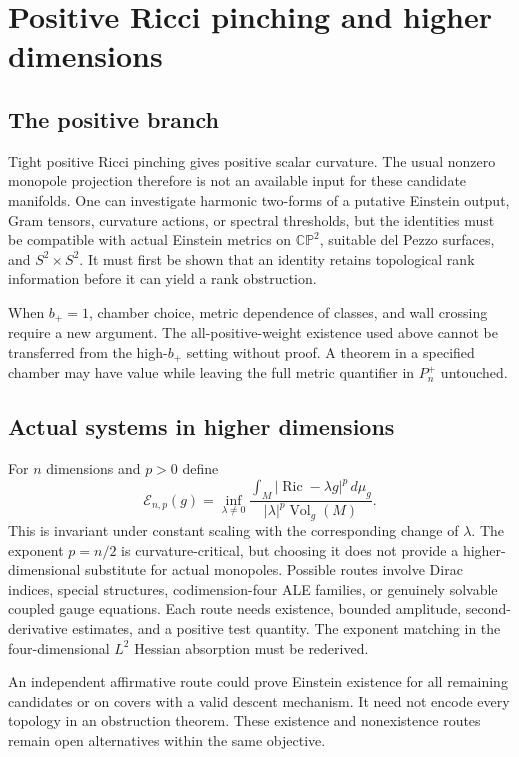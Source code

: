 \documentclass[11pt,a4paper]{article}
\theoremstyle{definition}
\theoremstyle{remark}
\DeclareMathOperator{\Ric}{Ric}
\DeclareMathOperator{\Vol}{Vol}
\newcommand{\CP}{\mathbb{CP}}
\newcommand{\cE}{\mathcal E}
\numberwithin{equation}{section}
\begin{document}
\section{Positive Ricci pinching and higher dimensions}\label{sec:positive-higher}
\subsection{The positive branch}\label{sub:positive}
Tight positive Ricci pinching gives positive scalar curvature. The usual
nonzero monopole projection therefore is not an available input for
these candidate manifolds. One can investigate harmonic two-forms of a
putative Einstein output, Gram tensors, curvature actions, or spectral
thresholds, but the identities must be compatible with actual Einstein
metrics on $\CP^2$, suitable del Pezzo surfaces, and $S^2\times S^2$.
It must first be shown that an identity retains topological rank
information before it can yield a rank obstruction.

When $b_+=1$, chamber choice, metric dependence of classes, and wall
crossing require a new argument. The all-positive-weight existence used
above cannot be transferred from the high-$b_+$ setting without proof.
A theorem in a specified chamber may have value while leaving the full
metric quantifier in $P_n^+$ untouched.

\subsection{Actual systems in higher dimensions}\label{sub:higher}
For $n$ dimensions and $p>0$ define
\begin{equation}\label{eq:higher-energy}
 \cE_{n,p}(g)=\inf_{\lambda\ne0}
 \frac{\int_M|\Ric-\lambda g|^p\,d\mu_g}{|\lambda|^p\Vol_g(M)}.
\end{equation}
This is invariant under constant scaling with the corresponding change
of $\lambda$. The exponent $p=n/2$ is curvature-critical, but choosing it
does not provide a higher-dimensional substitute for actual monopoles.
Possible routes involve Dirac indices, special structures, codimension-four
ALE families, or genuinely solvable coupled gauge equations. Each route
needs existence, bounded amplitude, second-derivative estimates, and a
positive test quantity. The exponent matching in the four-dimensional
$L^2$ Hessian absorption must be rederived.

An independent affirmative route could prove Einstein existence for all
remaining candidates or on covers with a valid descent mechanism.
It need not encode every topology in an obstruction theorem. These
existence and nonexistence routes remain open alternatives within the
same objective.
\end{document}
